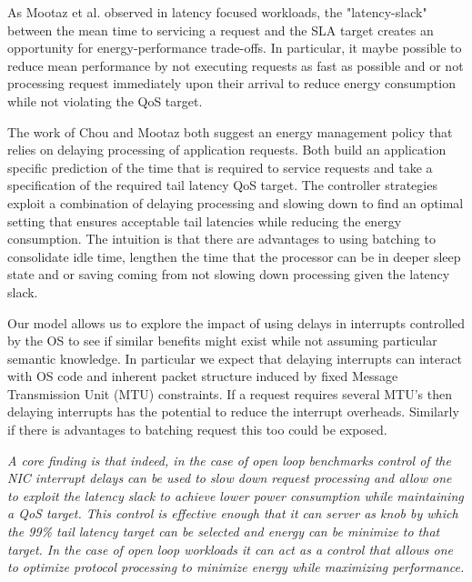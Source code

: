 As Mootaz et al.\cite{mootaz} observed in latency focused workloads, the "latency-slack" between the mean time to servicing a request and the SLA target creates an opportunity for energy-performance trade-offs.  In particular, it maybe possible to reduce mean performance by not executing requests as fast as possible and or not processing request immediately upon their arrival to reduce energy consumption while not violating the QoS target.  

The work of Chou and Mootaz both suggest an energy management policy that relies on delaying processing of application requests. Both build an application specific prediction of the time that is required to service  requests and take a specification of the required tail latency QoS target.  The  controller strategies exploit a combination of delaying processing and slowing down to find an optimal setting that ensures acceptable tail latencies while reducing the energy consumption.  The intuition is that there are advantages to using batching to consolidate idle time, lengthen the time that the processor can be in deeper sleep state and or saving coming from not slowing down processing given the latency slack.    

Our model allows us to explore the impact of using delays in interrupts controlled by the OS to see if similar benefits  might exist while not assuming particular semantic knowledge.  In particular we expect that delaying interrupts can interact with OS code and inherent packet structure induced by fixed Message Transmission Unit (MTU) constraints.  If a request requires several MTU's then delaying interrupts has the potential to reduce the interrupt overheads.  Similarly if there is advantages to batching request this too could be exposed.

{\em A core finding is that indeed, in the case of open loop benchmarks control of the NIC interrupt delays can be used to slow down request processing and allow one to exploit the latency slack to achieve lower power consumption while maintaining a QoS target.  This control is effective enough that it can server as knob by which the 99\% tail latency target can be selected and energy can be minimize to that target.  In the case of open loop workloads it can act as a control that allows one to optimize protocol processing to minimize energy while maximizing performance.}



